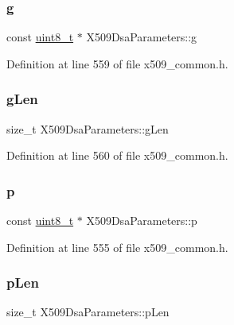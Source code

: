\subsubsection{\texorpdfstring{g}{g}}
{\footnotesize\ttfamily const \hyperlink{stdint_8h_aba7bc1797add20fe3efdf37ced1182c5}{uint8\+\_\+t} $\ast$ X509\+Dsa\+Parameters\+::g}



Definition at line 559 of file x509\+\_\+common.\+h.

\mbox{\label{structX509DsaParameters_a84e6f3a0159da3fff5bf9315be4cf5f7}} 
\subsubsection{\texorpdfstring{g\+Len}{gLen}}
{\footnotesize\ttfamily size\+\_\+t X509\+Dsa\+Parameters\+::g\+Len}



Definition at line 560 of file x509\+\_\+common.\+h.

\mbox{\label{structX509DsaParameters_adf55df7def4d98995045e1c23e995cde}} 
\subsubsection{\texorpdfstring{p}{p}}
{\footnotesize\ttfamily const \hyperlink{stdint_8h_aba7bc1797add20fe3efdf37ced1182c5}{uint8\+\_\+t} $\ast$ X509\+Dsa\+Parameters\+::p}



Definition at line 555 of file x509\+\_\+common.\+h.

\mbox{\label{structX509DsaParameters_a492453aa50210c40372c6d76ff955c7f}} 
\subsubsection{\texorpdfstring{p\+Len}{pLen}}
{\footnotesize\ttfamily size\+\_\+t X509\+Dsa\+Parameters\+::p\+Len}



